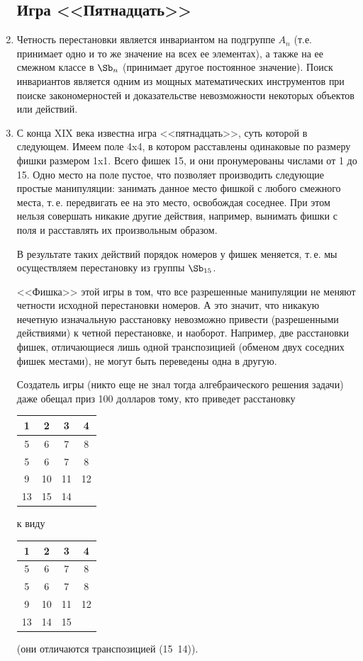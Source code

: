 \begin{enumerate}
\subsection*{Игра <<Пятнадцать>>}


\item Четность перестановки является инвариантом на подгруппе $A_n$ (т.е. принимает одно и то же значение на всех ее элементах), а также на ее смежном классе в $\Sb_n$ (принимает другое постоянное значение). Поиск инвариантов является одним из мощных математических инструментов при поиске закономерностей и доказательстве невозможности некоторых объектов или действий.

\item С конца XIX века известна игра <<пятнадцать>>, суть которой в следующем. Имеем поле 4x4, в котором расставлены одинаковые по размеру фишки размером 1x1. Всего фишек 15, и они пронумерованы числами от 1 до 15. Одно место на поле пустое, что позволяет производить следующие простые манипуляции: занимать данное место фишкой с любого смежного места, т.\,е. передвигать ее на это место, освобождая соседнее.
При этом нельзя совершать никакие другие действия, например, вынимать фишки с поля и расставлять их произвольным образом.

В результате таких действий порядок номеров у фишек меняется, т.\,е. мы осуществляем перестановку из группы $\Sb_{15}$.

<<Фишка>> этой игры в том, что все разрешенные манипуляции не меняют четности исходной перестановки номеров. А это значит, что никакую нечетную изначальную расстановку невозможно привести (разрешенными действиями) к четной перестановке, и наоборот. Например, две расстановки фишек, отличающиеся лишь одной транспозицией (обменом двух соседних фишек местами), не могут быть переведены одна в другую.

Создатель игры (никто еще не знал тогда алгебраического решения задачи) даже обещал приз 100 долларов тому, кто приведет расстановку
\begin{center}
\begin{tabular}{|c|c|c|c|}
\hline
1 & 2 & 3 & 4 \\ \hline
5 & 6 & 7 & 8 \\ \hline
5 & 6 & 7 & 8 \\ \hline
9 & 10 & 11 & 12 \\ \hline
13 &15 & 14 & \\ \hline
\end{tabular}
\quad к виду \quad
\begin{tabular}{|c|c|c|c|}
\hline
1 & 2 & 3 & 4 \\ \hline
5 & 6 & 7 & 8 \\ \hline
5 & 6 & 7 & 8 \\ \hline
9 & 10 & 11 & 12 \\ \hline
13 &14 & 15 & \\ \hline
\end{tabular}
\end{center}
(они отличаются транспозицией (15\ 14)).


\end{enumerate}

